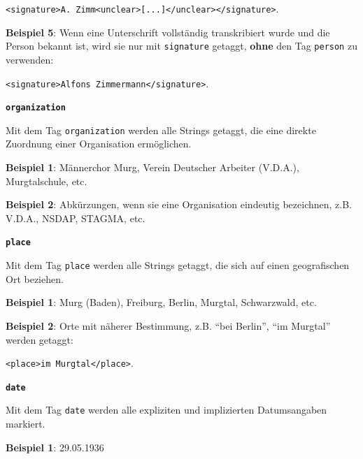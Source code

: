 \documentclass[12pt, a4paper, ngerman, bidi=default]{article}
\begin{document}
\begin{description}
    \colorbox{VeryLightGray}{\texttt{\textless signature\textgreater A. Zimm\textless unclear\textgreater [...]\textless /unclear\textgreater\textless /signature\textgreater}.} 
    
    \textbf{ Beispiel 5}: Wenn eine Unterschrift vollständig transkribiert wurde und die Person bekannt ist, wird sie nur mit \texttt{\colorbox{signature}{signature}} getaggt, \textbf{ohne} den Tag \texttt{\colorbox{person}{person}} zu verwenden:  

    \colorbox{VeryLightGray}{\texttt{\textless signature\textgreater Alfons Zimmermann\textless /signature\textgreater}.} 
    
    \item \textbf{\colorbox{organization}{\texttt{organization}}}
        
    Mit dem Tag \texttt{\colorbox{organization}{organization}} werden alle Strings getaggt, die eine direkte Zuordnung einer Organisation ermöglichen.  
    
    \noindent \textbf{ Beispiel 1}: Männerchor Murg, Verein Deutscher Arbeiter (V.D.A.), Murgtalschule, etc.

    \textbf{ Beispiel 2}: Abkürzungen, wenn sie eine Organisation eindeutig bezeichnen, z.B. V.D.A., NSDAP, STAGMA, etc.
    

    \item \textbf{\colorbox{place}{\texttt{place}}}
        
    Mit dem Tag \texttt{\colorbox{place}{place}} werden alle Strings getaggt, die sich auf einen geografischen Ort beziehen.  
    
    \noindent \textbf{ Beispiel 1}: Murg (Baden), Freiburg, Berlin, Murgtal, Schwarzwald, etc.

    \textbf{ Beispiel 2}: Orte mit näherer Bestimmung, z.B. \enquote{bei Berlin}, \enquote{im Murgtal} werden getaggt:  

    \colorbox{VeryLightGray}{\texttt{\textless place\textgreater im Murgtal\textless /place\textgreater}.} 

    
    \item \textbf{\colorbox{date}{\texttt{date}}}
        
    Mit dem Tag \texttt{\colorbox{date}{date}} werden alle expliziten und implizierten Datumsangaben markiert.  
    
    \noindent \textbf{ Beispiel 1}:  29.05.1936


\end{description}
\end{document}
